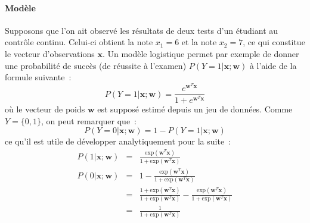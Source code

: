 \documentclass[11pt,openany]{book}
\begin{document}
\paragraph{Modèle} Supposons que l'on ait observé les résultats de
deux tests d'un étudiant au contrôle continu. 
Celui-ci obtient la note $x_1 = 6$ et la note $x_2 = 7$, ce qui
constitue le vecteur d'observations $\mathbf{x}$.
Un modèle logistique permet par exemple de donner une probabilité de succès (de réussite à l'examen)
$P(Y=1| \mathbf{x};\mathbf{w})$ à l'aide de la formule suivante~:
\begin{equation}
 P(Y=1|\mathbf{x}; \mathbf{w}) =\frac{e^{\mathbf{w}^T
     \mathbf{x}}}{1+e^{\mathbf{w}^T \mathbf{x}}}
\end{equation}
où le vecteur de poids $\mathbf{w}$ est supposé estimé depuis un jeu
de données. Comme $Y =  \{0,1\}$, on peut remarquer que~:
\begin{displaymath}
P(Y=0|\mathbf{x};\mathbf{w}) = 1 - P(Y=1| \mathbf{x};\mathbf{w})
\end{displaymath}
ce qu'il est utile de développer analytiquement pour la suite~:
\begin{eqnarray}
P(1|\mathbf{x};\mathbf{w}) &=&\frac{\text{exp}(\mathbf{w}^T
     \mathbf{x})}{1+\text{exp}(\mathbf{w}^T
     \mathbf{x})}\label{eq-logistic-positive}\\
P(0|\mathbf{x};\mathbf{w}) &=& 1 - \frac{\text{exp}(\mathbf{w}^T
     \mathbf{x})}{1+\text{exp}(\mathbf{w}^T \mathbf{x})}\\
&=&\frac{1+\text{exp}(\mathbf{w}^T \mathbf{x})}{1+\text{exp}(\mathbf{w}^T \mathbf{x})} - \frac{\text{exp}(\mathbf{w}^T
     \mathbf{x})}{1+\text{exp}(\mathbf{w}^T \mathbf{x})}\\
&=&\frac{1}{1+\text{exp}(\mathbf{w}^T \mathbf{x})}\label{eq-logistic-negative}
\end{eqnarray}
\end{document}
